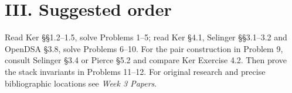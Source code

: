 \documentclass[11pt]{article}
\begin{document}
\section*{III. Suggested order}
Read Ker \S\S1.2--1.5, solve Problems 1--5; read Ker \S4.1, Selinger \S\S3.1--3.2 and OpenDSA \S3.8, solve Problems 6--10. For the pair construction in Problem 9, consult Selinger \S3.4 or Pierce \S5.2 and compare Ker Exercise 4.2. Then prove the stack invariants in Problems 11--12. For original research and precise bibliographic locations see \emph{Week 3 Papers}.
\end{document}
